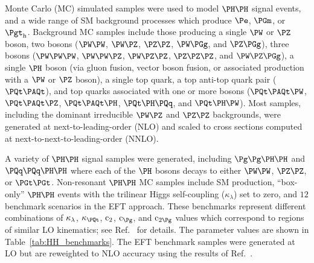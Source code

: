 Monte Carlo (MC) simulated samples were used to model $\HH$ signal events, and a wide range
of SM background processes which produce $\Pe$, $\PGm$, or $\tauh$.  Background MC samples
include those producing a single $\PW$ or $\PZ$ boson, two bosons ($\PW\PW$, $\PW\PZ$, $\PZ\PZ$, $\PW\Pgg$, and $\PZ\Pgg$),
three bosons ($\PW\PW\PW$, $\PW\PW\PZ$, $\PW\PZ\PZ$, $\PZ\PZ\PZ$, and $\PW\PZ\Pgg$), a single $\PHiggs$ boson (via gluon fusion,
vector boson fusion, or associated production with a $\PW$ or $\PZ$ boson), a single top quark,
a top anti-top quark pair ($\ttbar$), and top quarks associated with one or more bosons ($\ttW$,
$\ttZ$, $\ttH$, $\tHq$, and $\tHW$).  Most samples, including the dominant irreducible $\PW\PZ$ and $\PZ\PZ$
backgrounds, were generated at next-to-leading-order (NLO) and scaled to cross sections
computed at next-to-next-to-leading-order (NNLO).

A variety of $\HH$ signal samples were generated, including $\ggHH$ and $\qqHH$
where each of the $\PHiggs$ bosons decays to either $\PW\PW$, $\PZ\PZ$, or $\PGt\PGt$.
Non-resonant $\HH$ MC samples include SM production, ``box-only'' $\HH$ events with
the trilinear Higgs self-coupling ($\kappa_{\lambda}$) set to zero, and $12$ benchmark scenarios
in the EFT approach.  These benchmarks represent different combinations of
$\kappa_{\lambda}$, $\kappat$, $\text{c}_{2}$, $\cg$, and $\cgg$ values which correspond
to regions of similar LO kinematics; see Ref.~\cite{Carvalho:2015ttv} for details.  The parameter
values are shown in Table~\ref{tab:HH_benchmarks}.  The EFT benchmark samples were
generated at LO but are reweighted to NLO accuracy using the results of Ref.~\cite{Buchalla:2018yce}.

